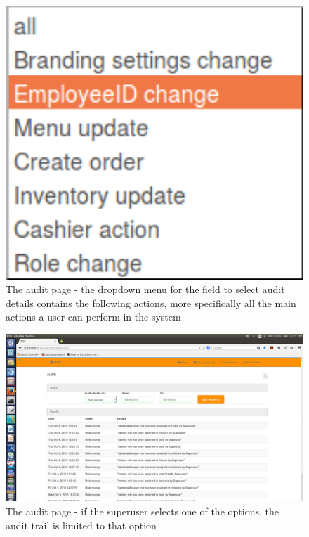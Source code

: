 \documentclass[a4paper,12pt]{report}
\begin{document}
\begin{figure}[H]
  \centering
    \includegraphics[width=1.0\textwidth]{screenshots/Menu_001.png}
    \caption{The audit page - the dropdown menu for the field to select audit details contains the following actions, more specifically all the main actions a user can perform in the system} 
\end{figure}

\begin{figure}[H]
  \centering
    \includegraphics[width=1.0\textwidth]{screenshots/auditRole.png}
    \caption{The audit page - if the superuser selects one of the options, the audit trail is limited to that option} 
\end{figure}
\end{document}
